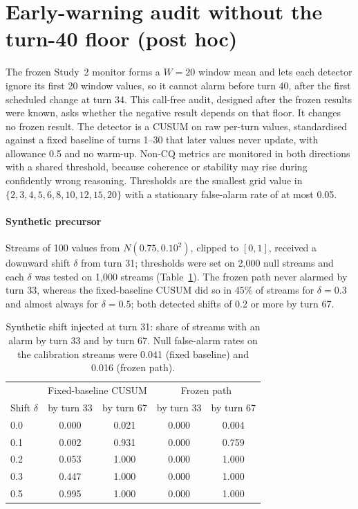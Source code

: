 \documentclass[10pt]{article}
\begin{document}
\section{Early-warning audit without the turn-40 floor (post hoc)}
\label{sec:forensic}
The frozen Study~2 monitor forms a $W=20$ window mean and lets each detector
ignore its first 20 window values, so it cannot alarm before turn 40, after the
first scheduled change at turn 34. This call-free audit, designed after the
frozen results were known, asks whether the negative result depends on that
floor. It changes no frozen result. The detector is a CUSUM on raw per-turn
values, standardised against a fixed baseline of turns 1--30 that later values
never update, with allowance 0.5 and no warm-up. Non-CQ metrics are monitored in
both directions with a shared threshold, because coherence or stability may
rise during confidently wrong reasoning. Thresholds are the smallest grid value
in $\{2,3,4,5,6,8,10,12,15,20\}$ with a stationary false-alarm rate of at most
0.05.

\paragraph{Synthetic precursor}
Streams of 100 values from $N(0.75,0.10^2)$, clipped to $[0,1]$, received a
downward shift $\delta$ from turn 31; thresholds were set on 2,000 null streams
and each $\delta$ was tested on 1,000 streams (Table~\ref{tab:forensic-synth}).
The frozen path never alarmed by turn 33, whereas the fixed-baseline CUSUM did
so in 45\% of streams for $\delta=0.3$ and almost always for $\delta=0.5$; both
detected shifts of 0.2 or more by turn 67.

\begin{table}[h]\centering\small
\caption{Synthetic shift injected at turn 31: share of streams with an alarm by
turn 33 and by turn 67. Null false-alarm rates on the calibration streams were
0.041 (fixed baseline) and 0.016 (frozen path).}
\label{tab:forensic-synth}
\begin{tabular}{lcccc}\toprule
& \multicolumn{2}{c}{Fixed-baseline CUSUM} & \multicolumn{2}{c}{Frozen path}\\
Shift $\delta$ & by turn 33 & by turn 67 & by turn 33 & by turn 67\\\midrule
0.0 & 0.000 & 0.021 & 0.000 & 0.004\\
0.1 & 0.002 & 0.931 & 0.000 & 0.759\\
0.2 & 0.053 & 1.000 & 0.000 & 1.000\\
0.3 & 0.447 & 1.000 & 0.000 & 1.000\\
0.5 & 0.995 & 1.000 & 0.000 & 1.000\\
\bottomrule\end{tabular}\end{table}
\end{document}
